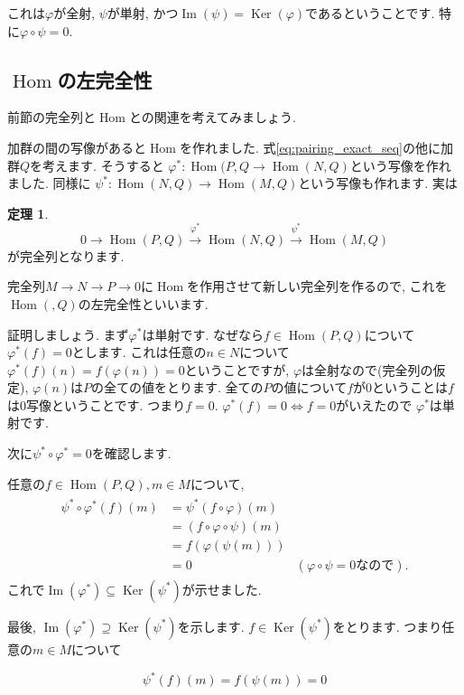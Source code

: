 \documentclass{jsarticle}
\newcommand{\makeop}[1]{\mathop{\mathrm{#1}}\nolimits}
\def\Im{\makeop{Im}}
\def\Ker{\makeop{Ker}}
\def\Hom{\makeop{Hom}}
\theoremstyle{definition}
\newtheorem{theorem}{定理}
\numberwithin{theorem}{section}
\begin{document}
これは$\varphi$が全射, $\psi$が単射, かつ$\Im(\psi) = \Ker(\varphi)$であるということです. 特に$\varphi\circ\psi = 0$.

\subsection{$\Hom$の左完全性}
前節の完全列と$\Hom$との関連を考えてみましょう.

加群の間の写像があると$\Hom$を作れました. 式\ref{eq:pairing_exact_seq}の他に加群$Q$を考えます. そうすると
$\varphi^*: \Hom(P, Q \rightarrow \Hom(N, Q)$という写像を作れました. 同様に
$\psi^*: \Hom(N, Q) \rightarrow \Hom(M, Q)$という写像も作れます. 実は

\begin{theorem}
\[
0 \rightarrow \Hom(P, Q) \xrightarrow{\varphi^*} \Hom(N, Q) \xrightarrow{\psi^*} \Hom(M, Q)
\]
が完全列となります.
\end{theorem}
完全列$M\rightarrow N \rightarrow P \rightarrow 0$に$\Hom$を作用させて新しい完全列を作るので,
これを$\Hom(, Q)$の左完全性といいます.

証明しましょう. まず$\varphi^*$は単射です. なぜなら$f \in \Hom(P, Q)$について$\varphi^*(f) = 0$とします. これは任意の$n\in N$について
$\varphi^*(f)(n) = f(\varphi(n)) = 0$ということですが, $\varphi$は全射なので(完全列の仮定), $\varphi(n)$は$P$の全ての値をとります.
全ての$P$の値について$f$が0ということは$f$は0写像ということです. つまり$f=0$. $\varphi^*(f) = 0 \Leftrightarrow f = 0$がいえたので
$\varphi^*$は単射です. 

次に$\psi^*\circ\varphi^* = 0$を確認します. 

任意の$f\in\Hom(P, Q), m \in M$について, 
\begin{eqnarray*}
\begin{aligned}
\psi^*\circ\varphi^*(f)(m) &= \psi^*(f\circ\varphi)(m)\\
&= (f\circ\varphi\circ\psi)(m)\\
&= f(\varphi(\psi(m)))\\
&= 0 & (\varphi\circ\psi = 0なので).
\end{aligned}
\end{eqnarray*}
これで$\Im(\varphi^*)\subseteq\Ker(\psi^*)$が示せました.

最後, $\Im(\varphi^*)\supseteq \Ker(\psi^*)$を示します. $f\in\Ker(\psi^*)$をとります. つまり任意の$m\in M$について

\begin{equation}
\label{eq:cond_im_elem}
\psi^*(f)(m) = f(\psi(m)) = 0
\end{equation}
\end{document}
